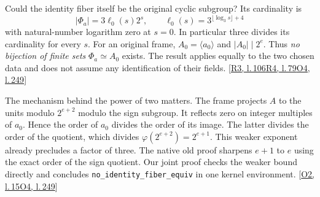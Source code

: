 \documentclass[12pt,letterpaper]{article}
\newcommand{\id}[1]{{\small\nolinkurl{#1}}}
\begin{document}
Could the identity fiber itself be the original cyclic subgroup? Its cardinality is
\[
            |\Phi_a|=3\ell_0(s)2^s,\qquad
            \ell_0(s)=3^{\lfloor\log_3 s\rfloor+4}
\]
with natural-number logarithm zero at $s=0$. In particular three divides its cardinality for every $s$. For an original frame, $A_0=\langle a_0\rangle$ and $|A_0|\mid 2^e$. Thus \emph{no bijection of finite sets} $\Phi_a\simeq A_0$ exists. The result applies equally to the two chosen data and does not assume any identification of their fields. {\footnotesize\sffamily\color{mute}[\href{https://github.com/leanprover-community/riemann-hypothesis/blob/e063a923620ee7787b4a1270421478645bf66bdb/src/New/Reduction/Data/FieldsAndPlaces.lean\#L106}{R3, l.\,106}\enspace \href{https://github.com/leanprover-community/riemann-hypothesis/blob/e063a923620ee7787b4a1270421478645bf66bdb/src/New/Reduction/PrimeSums.lean\#L79}{R4, l.\,79}\enspace \href{https://github.com/nousentllc/riemann-hypothesis/blob/40e56bab026552e089d7afcfeff08d2defb9c005/src/Formalism/SharpRestriction/RamificationFrobenius/TotientGaloisClasses/FrameFacts.lean\#L249}{O4, l.\,249}]}

The mechanism behind the power of two matters. The frame projects $A$ to the units modulo $2^{e+2}$ modulo the sign subgroup. It reflects zero on integer multiples of $a_0$. Hence the order of $a_0$ divides the order of its image. The latter divides the order of the quotient, which divides $\varphi(2^{e+2})=2^{e+1}$. This weaker exponent already precludes a factor of three. The native old proof sharpens $e+1$ to $e$ using the exact order of the sign quotient. Our joint proof checks the weaker bound directly and concludes \id{no_identity_fiber_equiv} in one kernel environment. {\footnotesize\sffamily\color{mute}[\href{https://github.com/nousentllc/riemann-hypothesis/blob/40e56bab026552e089d7afcfeff08d2defb9c005/src/Formalism/SharpRestriction/RamificationFrobenius/TotientGaloisClasses/ZsmulGeneratorEqZeroOfProjection.lean\#L15}{O2, l.\,15}\enspace \href{https://github.com/nousentllc/riemann-hypothesis/blob/40e56bab026552e089d7afcfeff08d2defb9c005/src/Formalism/SharpRestriction/RamificationFrobenius/TotientGaloisClasses/FrameFacts.lean\#L249}{O4, l.\,249}]}
\end{document}
